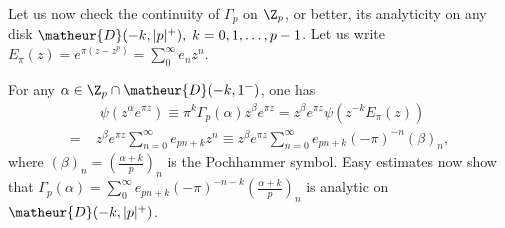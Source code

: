 \begin{para}\label{para-cont-of-gamma}
 Let us now check the continuity of $\Gamma_p$ on $\Z_p$, or
 better, its analyticity on any disk
 $\matheur{D}(-k,\vert p\vert^+),\; k=0,1,\ldots,p-1$.
 Let us write $E_{\pi}(z)=e^{\pi(z-z^p)}=\sum_0^{\infty} e_n z^n$.

 For any $\alpha \in \Z_p\cap \matheur{D}(-k,1^-)$, one has
 \begin{align*}
  & \;\psi(z^{\alpha} e^{\pi z})\equiv \pi^k\Gamma_p(\alpha)z^{\beta} e^{\pi z}
  = z^{\beta} e^{\pi z}\psi(z^{-k}E_\pi(z)) \\
  = \;& z^{\beta} e^{\pi z}\sum_{n=0}^{\infty} e_{pn+k} z^n
  \equiv z^{\beta} e^{\pi z}\sum_{n=0}^{\infty} e_{pn+k}(-\pi)^{-n} (\beta)_n,
 \end{align*} 
 where $(\beta)_n=(\frac{\alpha + k}{p})_n$ is the Pochhammer symbol.
 Easy estimates now show that $\Gamma_p(\alpha)=\sum_0^{\infty}
 e_{pn+k}(-\pi)^{-n-k} (\frac{\alpha + k}{p})_n$ is analytic on 
 $\matheur{D}(-k,\vert p\vert^+)$.
\end{para}
